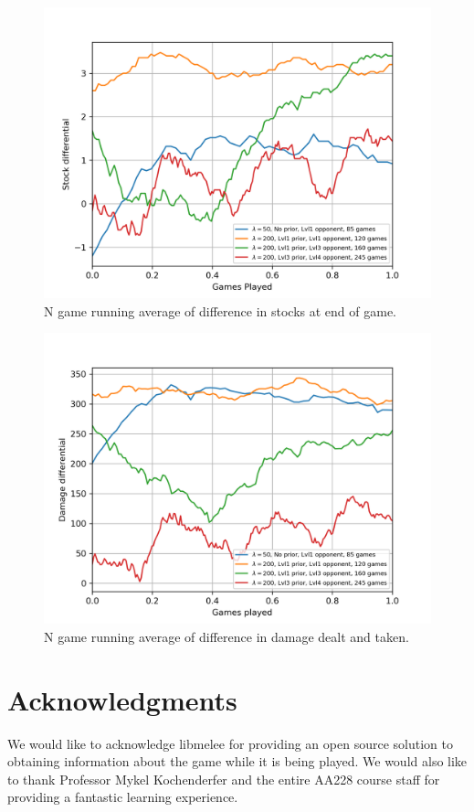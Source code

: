 \documentclass[journal]{new-aiaa}
\begin{document}
\begin{figure}[!htb]
\centering
	\includegraphics[width=120mm]{stocks.png}
	\caption{N game running average of difference in stocks at end of game. \label{stocks}}
\end{figure}

\begin{figure}[!htb]
\centering
	\includegraphics[width=120mm]{damage.png}
	\caption{N game running average of difference in damage dealt and taken. \label{damage}}
\end{figure}


%
%
\section*{Acknowledgments}

We would like to acknowledge libmelee for providing an open source solution to obtaining information about the game while it is being played. We would also like to thank Professor Mykel Kochenderfer and the entire AA228 course staff for providing a fantastic learning experience. 



\end{document}
